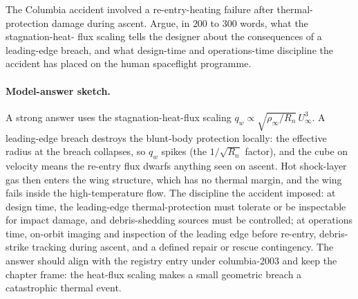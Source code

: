 \begin{exercise}
The Columbia accident \cite{acc:caib-columbia} involved a
re-entry-heating failure after thermal-protection damage during
ascent. Argue, in $200$ to $300$ words, what the stagnation-heat-
flux scaling tells the designer about the consequences of a
leading-edge breach, and what design-time and operations-time
discipline the accident has placed on the human spaceflight
programme.
\paragraph{Model-answer sketch.} A strong answer uses the
stagnation-heat-flux scaling $q_w \propto \sqrt{\rho_\infty/R_n}
\,U_\infty^3$. A leading-edge breach destroys the blunt-body
protection locally: the effective radius at the breach collapses, so
$q_w$ spikes (the $1/\sqrt{R_n}$ factor), and the cube on velocity
means the re-entry flux dwarfs anything seen on ascent. Hot shock-layer
gas then enters the wing structure, which has no thermal margin, and
the wing fails inside the high-temperature flow. The discipline the
accident imposed: at design time, the leading-edge thermal-protection
must tolerate or be inspectable for impact damage, and debris-shedding
sources must be controlled; at operations time, on-orbit imaging and
inspection of the leading edge before re-entry, debris-strike tracking
during ascent, and a defined repair or rescue contingency. The answer
should align with the registry entry under columbia-2003 and keep the
chapter frame: the heat-flux scaling makes a small geometric breach a
catastrophic thermal event.
\end{exercise}

